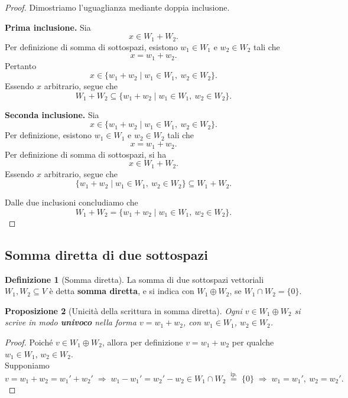 \documentclass[11pt,a4paper]{article}
\theoremstyle{plain}
\newtheorem{prop}{Proposizione}[section]
\theoremstyle{definition}
\newtheorem{defn}[prop]{Definizione}
\theoremstyle{remark}
\begin{document}
\begin{proof}
    Dimostriamo l'uguaglianza mediante doppia inclusione.

    \textbf{Prima inclusione.}
    Sia
    \[
        x\in W_1+W_2.
    \]
    Per definizione di somma di sottospazi, esistono
    $w_1\in W_1$ e $w_2\in W_2$ tali che
    \[
        x=w_1+w_2.
    \]
    Pertanto
    \[
        x\in\{w_1+w_2\mid w_1\in W_1,\ w_2\in W_2\}.
    \]
    Essendo $x$ arbitrario, segue che
    \[
        W_1+W_2 \subseteq
        \{w_1+w_2\mid w_1\in W_1,\ w_2\in W_2\}.
    \]

    \textbf{Seconda inclusione.}
    Sia
    \[
        x\in\{w_1+w_2\mid w_1\in W_1,\ w_2\in W_2\}.
    \]
    Per definizione, esistono $w_1\in W_1$ e $w_2\in W_2$
    tali che
    \[
        x=w_1+w_2.
    \]
    Per definizione di somma di sottospazi, si ha
    \[
        x\in W_1+W_2.
    \]
    Essendo $x$ arbitrario, segue che
    \[
        \{w_1+w_2\mid w_1\in W_1,\ w_2\in W_2\}
        \subseteq W_1+W_2.
    \]

    Dalle due inclusioni concludiamo che
    \[
        \boxed{
        W_1+W_2
        =
        \{w_1+w_2\mid w_1\in W_1,\ w_2\in W_2\}.
        }
    \]
\end{proof}

\subsection{Somma diretta di due sottospazi}

\begin{defn}[Somma diretta]
    La somma di due sottospazi vettoriali $W_1,W_2\subseteq V$ è detta \textbf{somma diretta}, e si indica con $W_1\oplus W_2$, se $W_1\cap W_2=\{0\}$.
\end{defn}

\begin{prop}[Unicità della scrittura in somma diretta]
    Ogni $v\in W_1\oplus W_2$ si scrive in modo \textbf{univoco} nella forma $v = w_1+w_2$, con $w_1\in W_1$, $w_2\in W_2$.
\end{prop}
\begin{proof}
    Poiché $v\in W_1\oplus W_2$, allora per definizione $v=w_1+w_2$ per qualche $w_1\in W_1$, $w_2\in W_2$.
    \\ Supponiamo
    \[
        v = w_1+w_2=w_1'+w_2' \;\Rightarrow\;  w_1-w_1' = w_2'-w_2 \in W_1\cap W_2 \;\overset{\text{ip.}}{=}\; \{0\}\;\Rightarrow\;w_1=w_1',\ w_2=w_2'.
    \]
\end{proof}
\end{document}

